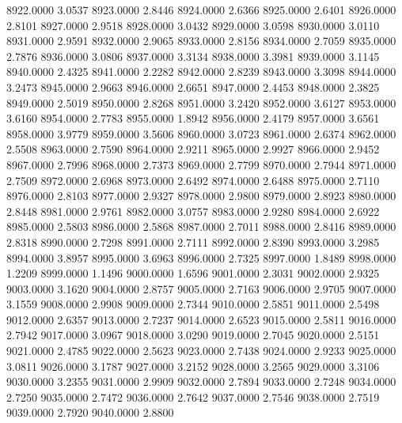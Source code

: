 8922.0000      3.0537
8923.0000      2.8446
8924.0000      2.6366
8925.0000      2.6401
8926.0000      2.8101
8927.0000      2.9518
8928.0000      3.0432
8929.0000      3.0598
8930.0000      3.0110
8931.0000      2.9591
8932.0000      2.9065
8933.0000      2.8156
8934.0000      2.7059
8935.0000      2.7876
8936.0000      3.0806
8937.0000      3.3134
8938.0000      3.3981
8939.0000      3.1145
8940.0000      2.4325
8941.0000      2.2282
8942.0000      2.8239
8943.0000      3.3098
8944.0000      3.2473
8945.0000      2.9663
8946.0000      2.6651
8947.0000      2.4453
8948.0000      2.3825
8949.0000      2.5019
8950.0000      2.8268
8951.0000      3.2420
8952.0000      3.6127
8953.0000      3.6160
8954.0000      2.7783
8955.0000      1.8942
8956.0000      2.4179
8957.0000      3.6561
8958.0000      3.9779
8959.0000      3.5606
8960.0000      3.0723
8961.0000      2.6374
8962.0000      2.5508
8963.0000      2.7590
8964.0000      2.9211
8965.0000      2.9927
8966.0000      2.9452
8967.0000      2.7996
8968.0000      2.7373
8969.0000      2.7799
8970.0000      2.7944
8971.0000      2.7509
8972.0000      2.6968
8973.0000      2.6492
8974.0000      2.6488
8975.0000      2.7110
8976.0000      2.8103
8977.0000      2.9327
8978.0000      2.9800
8979.0000      2.8923
8980.0000      2.8448
8981.0000      2.9761
8982.0000      3.0757
8983.0000      2.9280
8984.0000      2.6922
8985.0000      2.5803
8986.0000      2.5868
8987.0000      2.7011
8988.0000      2.8416
8989.0000      2.8318
8990.0000      2.7298
8991.0000      2.7111
8992.0000      2.8390
8993.0000      3.2985
8994.0000      3.8957
8995.0000      3.6963
8996.0000      2.7325
8997.0000      1.8489
8998.0000      1.2209
8999.0000      1.1496
9000.0000      1.6596
9001.0000      2.3031
9002.0000      2.9325
9003.0000      3.1620
9004.0000      2.8757
9005.0000      2.7163
9006.0000      2.9705
9007.0000      3.1559
9008.0000      2.9908
9009.0000      2.7344
9010.0000      2.5851
9011.0000      2.5498
9012.0000      2.6357
9013.0000      2.7237
9014.0000      2.6523
9015.0000      2.5811
9016.0000      2.7942
9017.0000      3.0967
9018.0000      3.0290
9019.0000      2.7045
9020.0000      2.5151
9021.0000      2.4785
9022.0000      2.5623
9023.0000      2.7438
9024.0000      2.9233
9025.0000      3.0811
9026.0000      3.1787
9027.0000      3.2152
9028.0000      3.2565
9029.0000      3.3106
9030.0000      3.2355
9031.0000      2.9909
9032.0000      2.7894
9033.0000      2.7248
9034.0000      2.7250
9035.0000      2.7472
9036.0000      2.7642
9037.0000      2.7546
9038.0000      2.7519
9039.0000      2.7920
9040.0000      2.8800
